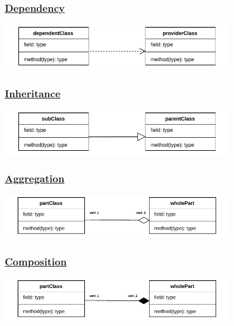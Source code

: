 \subsubsection*{\underline{Dependency}}

\begin{center}
\includegraphics[width=0.75\textwidth]{Chapters/Diagram/OOP/Sum/Depend/depend.drawio.pdf}
\end{center}

\subsubsection*{\underline{Inheritance}}

\begin{center}
\includegraphics[width=0.75\textwidth]{Chapters/Diagram/OOP/Sum/Inhe/inherit.drawio.pdf}
\end{center}

\subsubsection*{\underline{Aggregation}}

\begin{center}
\includegraphics[width=0.75\textwidth]{Chapters/Diagram/OOP/Sum/Aggrega/aggrega.drawio.pdf}
\end{center}

\subsubsection*{\underline{Composition}}

\begin{center}
\includegraphics[width=0.75\textwidth]{Chapters/Diagram/OOP/Sum/Composition/composition.drawio.pdf}
\end{center}
